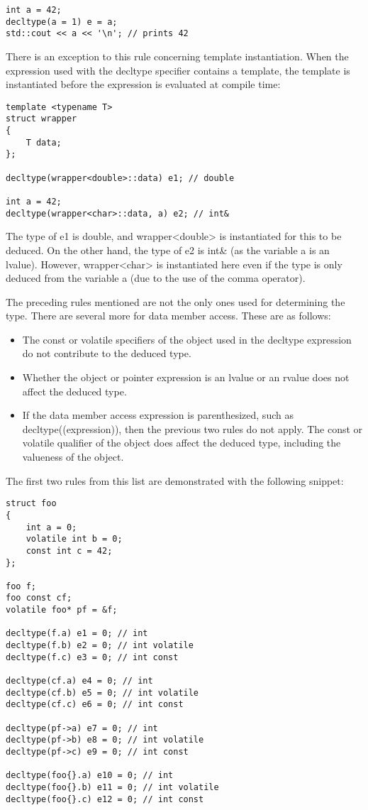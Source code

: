 \begin{lstlisting}[style=styleCXX]
int a = 42;
decltype(a = 1) e = a;
std::cout << a << '\n'; // prints 42
\end{lstlisting}

There is an exception to this rule concerning template instantiation. When the expression used with the decltype specifier contains a template, the template is instantiated before the expression is evaluated at compile time:

\begin{lstlisting}[style=styleCXX]
template <typename T>
struct wrapper
{
	T data;
};

decltype(wrapper<double>::data) e1; // double

int a = 42;
decltype(wrapper<char>::data, a) e2; // int&
\end{lstlisting}

The type of e1 is double, and wrapper<double> is instantiated for this to be deduced. On the other hand, the type of e2 is int\& (as the variable a is an lvalue). However, wrapper<char> is instantiated here even if the type is only deduced from the variable a (due to the use of the comma operator).

The preceding rules mentioned are not the only ones used for determining the type. There are several more for data member access. These are as follows:

\begin{itemize}
\item
The const or volatile specifiers of the object used in the decltype expression do not contribute to the deduced type.

\item
Whether the object or pointer expression is an lvalue or an rvalue does not affect the deduced type.

\item
If the data member access expression is parenthesized, such as decltype((expression)), then the previous two rules do not apply. The const or volatile qualifier of the object does affect the deduced type, including the valueness of the object.
\end{itemize}

The first two rules from this list are demonstrated with the following snippet:

\begin{lstlisting}[style=styleCXX]
struct foo
{
	int a = 0;
	volatile int b = 0;
	const int c = 42;
};

foo f;
foo const cf;
volatile foo* pf = &f;

decltype(f.a) e1 = 0; // int
decltype(f.b) e2 = 0; // int volatile
decltype(f.c) e3 = 0; // int const

decltype(cf.a) e4 = 0; // int
decltype(cf.b) e5 = 0; // int volatile
decltype(cf.c) e6 = 0; // int const

decltype(pf->a) e7 = 0; // int
decltype(pf->b) e8 = 0; // int volatile
decltype(pf->c) e9 = 0; // int const

decltype(foo{}.a) e10 = 0; // int
decltype(foo{}.b) e11 = 0; // int volatile
decltype(foo{}.c) e12 = 0; // int const
\end{lstlisting}

